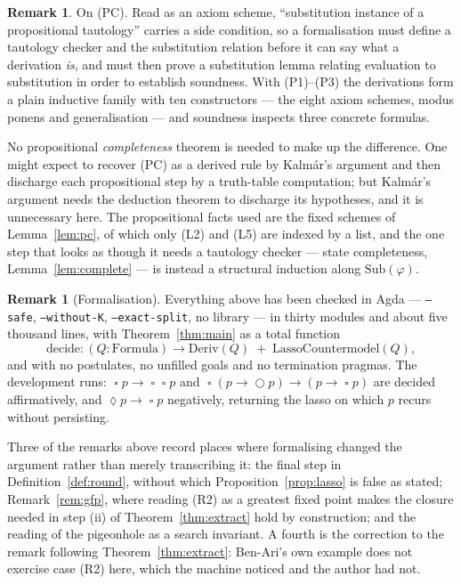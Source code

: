\documentclass[11pt,a4paper]{article}
\theoremstyle{definition}
\newtheorem{remark}[theorem]{Remark}
\newcommand{\Next}{\mathop{\bigcirc}}
\newcommand{\Always}{\mathop{\square}}
\newcommand{\Event}{\mathop{\lozenge}}
\newcommand{\Sub}{\mathrm{Sub}}
\begin{document}
\begin{remark}\label{rem:pc}
On (PC).  Read as an axiom scheme, ``substitution instance of a propositional
tautology'' carries a side condition, so a formalisation must define a tautology
checker and the substitution relation before it can say what a derivation
\emph{is}, and must then prove a substitution lemma relating evaluation to
substitution in order to establish soundness.  With (P1)--(P3) the derivations
form a plain inductive family with ten constructors --- the eight axiom schemes,
modus ponens and generalisation --- and soundness inspects
three concrete formulas.

No propositional \emph{completeness} theorem is needed to make up the
difference.  One might expect to recover (PC) as a derived rule by Kalm\'ar's
argument and then discharge each propositional step by a truth-table
computation; but Kalm\'ar's argument needs the deduction theorem to discharge
its hypotheses, and it is unnecessary here.  The propositional facts used are
the fixed schemes of Lemma~\ref{lem:pc}, of which only (L2) and (L5) are indexed
by a list, and the one step that looks as though it needs a tautology checker
--- state completeness, Lemma~\ref{lem:complete} --- is instead a structural
induction along $\Sub(\varphi)$.
\end{remark}

\begin{remark}[Formalisation]
Everything above has been checked in Agda --- \texttt{--safe},
\texttt{--without-K}, \texttt{--exact-split}, no library --- in thirty modules
and about five thousand lines, with Theorem~\ref{thm:main} as a total function
\[
  \mathrm{decide} : (Q:\mathrm{Formula})\to
  \mathrm{Deriv}(Q)\;+\;\mathrm{LassoCountermodel}(Q),
\]
and with no postulates, no unfilled goals and no termination pragmas.  The
development runs: $\Always p\to\Always\Always p$ and
$\Always(p\to\Next p)\to(p\to\Always p)$ are decided affirmatively, and
$\Event p\to\Always p$ negatively, returning the lasso on which $p$ recurs
without persisting.

Three of the remarks above record places where formalising changed the argument
rather than merely transcribing it: the final step in
Definition~\ref{def:round}, without which Proposition~\ref{prop:lasso} is false
as stated; Remark~\ref{rem:gfp}, where reading (R2) as a greatest fixed point
makes the closure needed in step (ii) of Theorem~\ref{thm:extract} hold by
construction; and the reading of the pigeonhole as a search invariant.  A
fourth is the correction to the remark following Theorem~\ref{thm:extract}:
Ben-Ari's own example does not exercise case (R2) here, which the machine
noticed and the author had not.
\end{remark}
\end{document}
